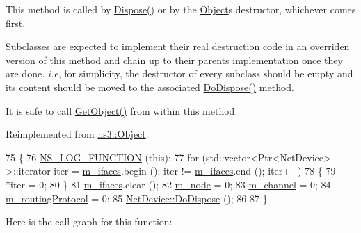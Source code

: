 This method is called by \hyperlink{classns3_1_1Object_aa90ae598863f6c251cdab3c3722afdaf}{Dispose()} or by the \hyperlink{classns3_1_1Object}{Object}\textquotesingle{}s destructor, whichever comes first.

Subclasses are expected to implement their real destruction code in an overriden version of this method and chain up to their parent\textquotesingle{}s implementation once they are done. {\itshape i.\+e}, for simplicity, the destructor of every subclass should be empty and its content should be moved to the associated \hyperlink{classns3_1_1MeshPointDevice_a6a5f293afb71ae4b58d523abccb3229b}{Do\+Dispose()} method.

It is safe to call \hyperlink{classns3_1_1Object_a13e18c00017096c8381eb651d5bd0783}{Get\+Object()} from within this method. 

Reimplemented from \hyperlink{classns3_1_1Object_a475d429a75d302d4775f4ae32479b287}{ns3\+::\+Object}.


\begin{DoxyCode}
75 \{
76   \hyperlink{log-macros-disabled_8h_a90b90d5bad1f39cb1b64923ea94c0761}{NS\_LOG\_FUNCTION} (\textcolor{keyword}{this});
77   \textcolor{keywordflow}{for} (std::vector<Ptr<NetDevice> >::iterator iter = \hyperlink{classns3_1_1MeshPointDevice_a651ebd5660f380c261cd9a055a95805d}{m\_ifaces}.begin (); iter != 
      \hyperlink{classns3_1_1MeshPointDevice_a651ebd5660f380c261cd9a055a95805d}{m\_ifaces}.end (); iter++)
78     \{
79       *iter = 0;
80     \}
81   \hyperlink{classns3_1_1MeshPointDevice_a651ebd5660f380c261cd9a055a95805d}{m\_ifaces}.clear ();
82   \hyperlink{classns3_1_1MeshPointDevice_a2da4f2175aa00207f0acd0712f815796}{m\_node} = 0;
83   \hyperlink{classns3_1_1MeshPointDevice_a56185011f8d2654cf842a6273e9e398e}{m\_channel} = 0;
84   \hyperlink{classns3_1_1MeshPointDevice_ac704fc10d4ed26d009f8bbfe71049d45}{m\_routingProtocol} = 0;
85   \hyperlink{classns3_1_1Object_a475d429a75d302d4775f4ae32479b287}{NetDevice::DoDispose} ();
86 
87 \}
\end{DoxyCode}


Here is the call graph for this function\+:



